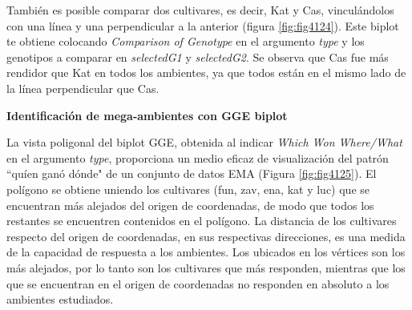 También es posible comparar dos cultivares, es decir, Kat y Cas, vinculándolos con una línea y una perpendicular a la anterior (figura \ref{fig:fig4124}). Este biplot te obtiene colocando \emph{Comparison of Genotype} en el argumento \emph{type} y los genotipos a comparar en \emph{selectedG1} y \emph{selectedG2}. Se observa que 
Cas fue más rendidor que Kat en todos los ambientes, ya que todos están en el mismo lado de la línea perpendicular que Cas. 



\textbf{Identificación de mega-ambientes con GGE biplot}

La vista poligonal del biplot GGE, obtenida al indicar \emph{Which Won Where/What} en el argumento \emph{type}, proporciona un medio eficaz de visualización del patrón ``quíen ganó dónde"  de un conjunto de datos EMA (Figura \ref{fig:fig4125}).  El polígono se obtiene uniendo los cultivares (fun, zav, ena, kat y luc) que se encuentran más alejados del origen de coordenadas, de modo que todos los restantes se encuentren contenidos en el polígono. La distancia de los cultivares respecto del origen de coordenadas, en sus respectivas direcciones, es una medida de la capacidad de respuesta a los ambientes. Los ubicados en los vértices son los más alejados, por lo tanto son los cultivares que más responden, mientras que los que se encuentran en el origen de coordenadas no responden en absoluto a los ambientes estudiados.


